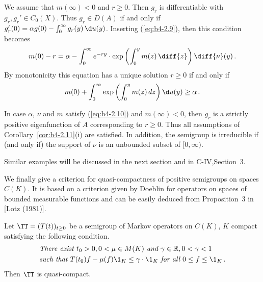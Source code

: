 We assume that $m(\infty) < 0$ and $r \geq 0$. Then $g_r$ is differentiable with $g_r, g_r' \in C_{0}(X)$. Thus $g_r \in D(A)$ if and only if $g_r'(0) = \alpha g(0) - \int_0^{\infty} g_r(y) \, \d
u(y)$. Inserting (\ref{eq:b4-2.9}), then this condition becomes
\[
m(0) - r = \alpha - \int_0^{\infty} e^{-ry} \cdot \exp\left(\int_{0}^{y}  m(z) \,\diff{z}\right)\diff{\nu}(y)\,.
\]
By monotonicity this equation has a unique solution $r \geq 0$ if and only if
\begin{equation}\label{eq:b4-2.10}
	m(0) + \int_0^{\infty} \exp\left(\int_0^y m(z) \, dz\right)\d
u(y) \geq \alpha\,.
\end{equation}

In case $\alpha$, $\nu$ and $m$ satisfy (\ref{eq:b4-2.10}) and $m(\infty) < 0$, then $g_r$ is a strictly positive eigenfunction of $A$ corresponding to $r \geq 0$. Thus all assumptions of Corollary~\ref{cor:b4-2.11}(i) are satisfied. In addition, the semigroup is irreducible if (and only if) the support of $\nu$ is an unbounded subset of $[0,\infty)$.

Similar examples will be discussed in the next section and in  C-IV,Section~3.

We finally give a criterion for quasi-compactness of positive semigroups on spaces $C(K)$. It is based on a criterion given by Doeblin for operators on spaces of bounded measurable functions and can be easily deduced from  Proposition~3 in [Lotz (1981)].
\begin{proposition}\label{prop:b4-2.13}
	Let $\TT = (T(t))_{t \geq 0}$ be a semigroup of Markov operators on $C(K)$, $K$ compact satisfying the following condition.
	\begin{equation}\label{eq:b4-2.12}	
		\begin{aligned}		
		&\textit{There exist } t_{0} > 0, 0 < \mu \in M(K) \textit{ and }  \gamma \in \mathbb{R}, 0 < \gamma < 1 \\
		&\textit{such that } T(t_{0})f - \mu(f)\1_K \leq \gamma \cdot \1_K \textit{ for all }  0 \leq f \leq \1_K\,.
		\end{aligned}
	\end{equation}
	Then $\TT$ is quasi-compact.
\end{proposition}
%
%
%
\newpage
